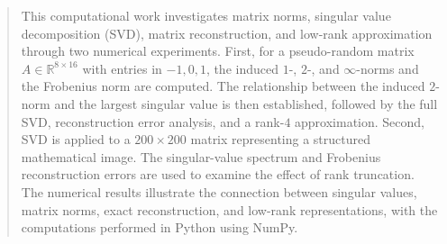 \begin{abstract}
This computational work investigates matrix norms, singular value decomposition (SVD), matrix reconstruction, and low-rank approximation through two numerical experiments. First, for a pseudo-random matrix $A \in \mathbb{R}^{8\times16}$ with entries in ${-1,0,1}$, the induced $1$-, $2$-, and $\infty$-norms and the Frobenius norm are computed. The relationship between the induced $2$-norm and the largest singular value is then established, followed by the full SVD, reconstruction error analysis, and a rank-$4$ approximation. Second, SVD is applied to a $200\times200$ matrix representing a structured mathematical image. The singular-value spectrum and Frobenius reconstruction errors are used to examine the effect of rank truncation. The numerical results illustrate the connection between singular values, matrix norms, exact reconstruction, and low-rank representations, with the computations performed in Python using NumPy.
\end{abstract}

